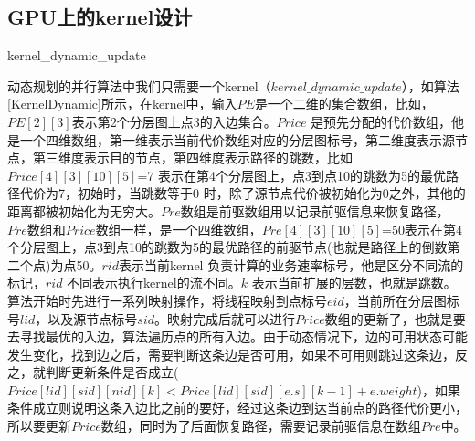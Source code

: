 \subsection{GPU上的kernel设计}
\begin{algorithm}[t]
\begin{algorithmic}[1]
\EndIf
\EndIf
\EndFor
\EndFunction
\end{algorithmic}
\caption{kernel\_dynamic\_update}
\label{KernelDynamic}
\end{algorithm}

动态规划的并行算法中我们只需要一个kernel（$kernel\_dynamic\_update$），如算法\ref{KernelDynamic}所示，在kernel中，输入$PE$是一个二维的集合数组，比如，$PE[2][3]$表示第2个分层图上点3的入边集合。$Price$ 是预先分配的代价数组，他是一个四维数组，第一维表示当前代价数组对应的分层图标号，第二维度表示源节点，第三维度表示目的节点，第四维度表示路径的跳数，比如$Price[4][3][10][5]$=7 表示在第4个分层图上，点3到点10的跳数为5的最优路径代价为7，初始时，当跳数等于0 时，除了源节点代价被初始化为0之外，其他的距离都被初始化为无穷大。$Pre$数组是前驱数组用以记录前驱信息来恢复路径，$Pre$数组和$Price$数组一样，是一个四维数组，$Pre[4][3][10][5]$=50表示在第4个分层图上，点3到点10的跳数为5的最优路径的前驱节点(也就是路径上的倒数第二个点)为点50。$rid$表示当前kernel 负责计算的业务速率标号，他是区分不同流的标记，$rid$ 不同表示执行kernel的流不同。$k$ 表示当前扩展的层数，也就是跳数。算法开始时先进行一系列映射操作，将线程映射到点标号$eid$，当前所在分层图标号$lid$，以及源节点标号$sid$。映射完成后就可以进行$Price$数组的更新了，也就是要去寻找最优的入边，算法遍历点的所有入边。由于动态情况下，边的可用状态可能发生变化，找到边之后，需要判断这条边是否可用，如果不可用则跳过这条边，反之，就判断更新条件是否成立($Price[lid][sid][nid][k]<Price[lid][sid][e.s][k-1]+e.weight$)，如果条件成立则说明这条入边比之前的要好，经过这条边到达当前点的路径代价更小，所以要更新$Price$数组，同时为了后面恢复路径，需要记录前驱信息在数组$Pre$中。

